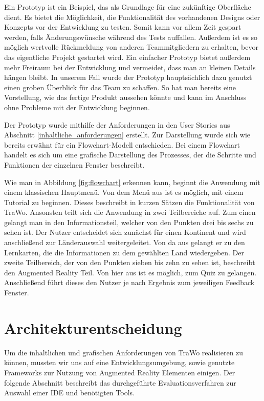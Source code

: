 Ein Prototyp ist ein Beispiel, das als Grundlage für eine zukünftige Oberfläche dient. Es bietet die Möglichkeit, die Funktionalität des vorhandenen Designs oder Konzepts vor der Entwicklung zu testen. Somit kann vor allem Zeit gespart werden, falls Änderungswünsche während des Tests auffallen. Außerdem ist es so möglich wertvolle Rückmeldung von anderen Teammitgliedern zu erhalten, bevor das eigentliche Projekt gestartet wird. Ein einfacher Prototyp bietet außerdem mehr Freiraum bei der Entwicklung und vermeidet, dass man an kleinen Details hängen bleibt. In unserem Fall wurde der Prototyp hauptsächlich dazu genutzt einen groben Überblick für das Team zu schaffen. So hat man bereits eine Vorstellung, wie das fertige Produkt aussehen könnte und kann im Anschluss ohne Probleme mit der Entwicklung beginnen.

Der Prototyp wurde mithilfe der Anforderungen in den User Stories aus Abschnitt \ref{inhaltliche_anforderungen} erstellt. Zur Darstellung wurde sich wie bereits erwähnt für ein Flowchart-Modell entschieden. Bei einem Flowchart handelt es sich um eine grafische Darstellung des Prozesses, der die Schritte und Funktionen der einzelnen Fenster beschreibt.

Wie man in Abbildung \ref{fig:flowchart} erkennen kann, beginnt die Anwendung mit einem klassischen Hauptmenü. Von dem Menü aus ist es möglich, mit einem Tutorial zu beginnen. Dieses beschreibt in kurzen Sätzen die Funktionalität von TraWo. Ansonsten teilt sich die Anwendung in zwei Teilbereiche auf. Zum einen gelangt man in den Informationsteil, welcher von den Punkten drei bis sechs zu sehen ist. Der Nutzer entscheidet sich zunächst für einen Kontinent und wird anschließend zur Länderauswahl weitergeleitet. Von da aus gelangt er zu den Lernkarten, die die Informationen zu dem gewählten Land wiedergeben. Der zweite Teilbereich, der von den Punkten sieben bis zehn zu sehen ist, beschreibt den Augmented Reality Teil. Von hier aus ist es möglich, zum Quiz zu gelangen. Anschließend führt dieses den Nutzer je nach Ergebnis zum jeweiligen Feedback Fenster.

\section{Architekturentscheidung} \label{architekturentscheidung}
Um die inhaltlichen und grafischen Anforderungen von TraWo realisieren zu können, mussten wir uns auf eine Entwicklungsumgebung, sowie genutzte Frameworks zur Nutzung von Augmented Reality Elementen einigen. Der folgende Abschnitt beschreibt das durchgeführte Evaluationsverfahren zur Auswahl einer IDE und benötigten Tools.
